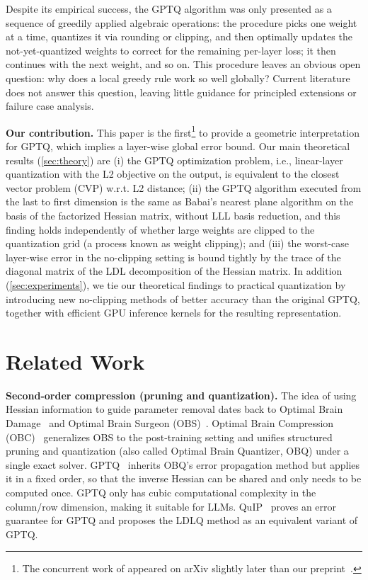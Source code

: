 \documentclass{article} %
\begin{document}
Despite its empirical success, the GPTQ algorithm was only presented as a sequence of greedily applied algebraic operations: the procedure picks one weight at a time, quantizes it via rounding or clipping, and then optimally updates the not-yet-quantized weights to correct for the remaining per-layer loss; it then continues with the next weight, and so on.
This procedure leaves an obvious open question: why does a local greedy rule work so well globally?
Current literature does not answer this question, leaving little guidance for principled extensions or failure case analysis.

\textbf{Our contribution.}
This paper is the first\footnote{The concurrent work of  \citet{birnick2025latticegeometryneuralnetwork} appeared on arXiv slightly later than our preprint~\citep{chen2025geometryllmquantizationgptq}.} to provide a geometric interpretation for GPTQ, which implies a layer-wise global error bound.
Our main theoretical results (\cref{sec:theory}) are (i) the GPTQ optimization problem, i.e., linear-layer quantization with the L2 objective on the output, is equivalent to the closest vector problem (CVP) w.r.t. L2 distance; (ii) the GPTQ algorithm executed from the last to first dimension is the same as Babai's nearest plane algorithm on the basis of the factorized Hessian matrix, without LLL basis reduction, and this finding holds independently of whether large weights are clipped to the quantization grid (a process known as weight clipping); and (iii) the worst-case layer-wise error in the no-clipping setting is bound tightly by the trace of the diagonal matrix of the LDL decomposition of the Hessian matrix.
In addition (\cref{sec:experiments}), we tie our theoretical findings to practical quantization by introducing new no-clipping methods of better accuracy than the original GPTQ, together with efficient GPU inference kernels for the resulting representation.

\section{Related Work}
\label{sec:related_work}

\textbf{Second-order compression (pruning and quantization).}
The idea of using Hessian information to guide parameter removal dates back to Optimal Brain Damage~\citep{lecun1990obd} and Optimal Brain Surgeon (OBS)~\citep{hassibi1993obs}.
Optimal Brain Compression (OBC)~\citep{frantar2022obc} generalizes OBS to the post-training setting and unifies structured pruning and quantization (also called Optimal Brain Quantizer, OBQ) under a single exact solver.
GPTQ~\citep{frantar2023optq} inherits OBQ's error propagation method but applies it in a fixed order, so that the inverse Hessian can be shared and only needs to be computed once.
GPTQ only has cubic computational complexity in the column/row dimension, making it suitable for LLMs.
QuIP~\citep{cheequip2023} proves an error guarantee for GPTQ and proposes the LDLQ method as an equivalent variant of GPTQ.
\end{document}
